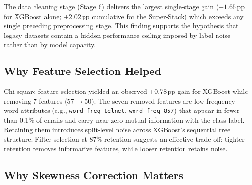 \documentclass[conference]{IEEEtran}
\begin{document}
\begin{table}[htbp]
\caption{Cumulative XGBoost Accuracy Gains Across Pipeline Stages}
\label{tab:summary}
\centering
{}
\end{table}

The data cleaning stage (Stage 6) delivers the largest
single-stage gain ($+1.65$\,pp for XGBoost alone; $+2.02$\,pp
cumulative for the Super-Stack) which exceeds any single
preceding preprocessing stage. This finding supports the hypothesis that legacy datasets
contain a hidden performance ceiling imposed by label noise
rather than by model capacity.

\subsection{Why Feature Selection Helped}

Chi-square feature selection yielded an observed +0.78\,pp gain
for XGBoost while removing 7 features (57$\to$50). The seven
removed features are low-frequency word attributes (e.g.,
\texttt{word\_freq\_telnet}, \texttt{word\_freq\_857}) that
appear in fewer than 0.1\% of emails and carry near-zero
mutual information with the class label. Retaining them
introduces split-level noise across XGBoost's sequential tree
structure. Filter selection at 87\% retention suggests an
effective trade-off: tighter retention removes informative
features, while looser retention retains noise.

\subsection{Why Skewness Correction Matters}
\end{document}
